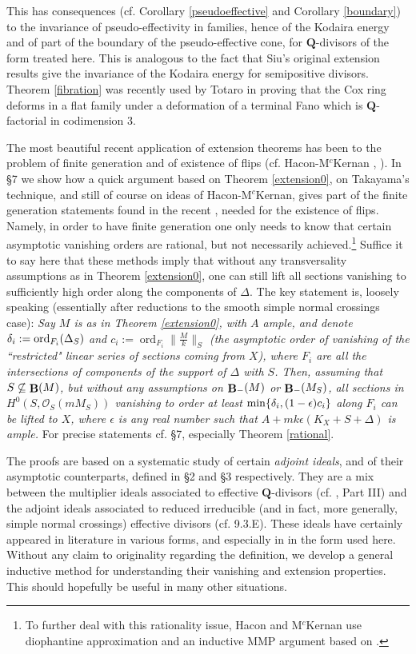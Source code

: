 \documentclass[11pt]{amsart}
\theoremstyle{plain}
\theoremstyle{definition}
\newcommand{\QQ}{\mathbf{Q}}
\newcommand{\OO}{\mathcal  {O}}
\DeclareMathOperator{\ord}{ord}
\DeclareMathOperator{\BB}{{\bf B}}
\begin{document}
This has consequences (cf. Corollary \ref{pseudoeffective} and Corollary \ref{boundary}) to the invariance of pseudo-effectivity in families, hence of the Kodaira energy and of part of the boundary of the pseudo-effective cone,  for $\QQ$-divisors of the form treated here. This is analogous to the fact that Siu's original extension results give the invariance of the Kodaira energy for semipositive divisors.
Theorem \ref{fibration} was recently used by Totaro \cite{totaro} in proving that the Cox ring deforms in a flat family under a deformation of a terminal Fano which is $\QQ$-factorial in codimension 3.

The most beautiful recent application of extension theorems has been to the problem of finite generation and of existence of flips 
(cf. Hacon-M$^c$Kernan \cite{hm2}, \cite{hm3}). In \S7 we show how a quick argument based on Theorem \ref{extension0}, on Takayama's technique, and still of course on ideas of Hacon-M$^c$Kernan, gives part of the finite generation statements found in the recent \cite{hm3}, needed for the existence of flips. Namely, in order to have finite generation one only needs to know that certain asymptotic vanishing orders are rational, but not necessarily achieved.\footnote{To further deal with this rationality issue, Hacon and M$^c$Kernan use diophantine approximation and an inductive MMP argument based on \cite{bchm}.} Suffice it to say here that these methods imply that without
any transversality assumptions as in Theorem \ref{extension0}, one can still lift all sections vanishing to sufficiently high order along the components of $\Delta$. The key statement is, loosely speaking (essentially 
after reductions to the smooth simple normal crossings case): \emph{Say $M$ is as in Theorem \ref{extension0}, with $A$ ample, and denote
$\delta_i : =  {\rm ord}_{F_i} (\Delta_S)$ and $c_i :=  \ord_{F_i} \parallel \frac{M}{k} \parallel_S$ (the asymptotic order of vanishing of the ``restricted" linear series of sections coming from $X$), where 
$F_i$ are all the intersections of components of the support of $\Delta$ with $S$.
Then, assuming that $S \not\subseteq \BB(M)$, but without any assumptions on $\BB_{-} (M)$ or $\BB_{-} (M_S)$, all sections in $H^0 (S, \OO_S(mM_S))$ vanishing to order at least ${\rm min}\{\delta_i, (1-\epsilon)c_i\}$ along $F_i$ can be lifted to $X$, where $\epsilon$ is any real number such that
$A  + mk\epsilon (K_X + S + \Delta)$ is ample.} 
For precise statements cf. \S7, especially Theorem \ref{rational}.

The proofs are based on a systematic study of certain \emph{adjoint ideals}, and of their asymptotic counterparts, defined in \S2 and \S3 respectively. They are a mix between the multiplier ideals associated to effective $\QQ$-divisors (cf. \cite{positivity}, Part III) and the adjoint ideals associated to reduced irreducible (and in fact, more generally, simple normal crossings) effective divisors (cf. \cite{positivity} 9.3.E). These ideals have certainly appeared in literature in various forms,
and especially in \cite{hm1} in the form used here. Without any claim to originality regarding the definition, we develop a general inductive method for understanding their vanishing and extension properties. This should hopefully be useful in many other situations. 
\end{document}
